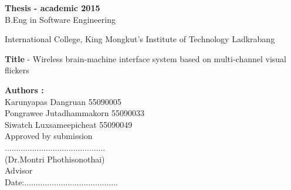 \begin{approve}
\textbf{Thesis - academic 2015}\\
B.Eng in Software Engineering

International College, King Mongkut's Institute of Technology Ladkrabang


\textbf{Title} - Wireless brain-machine interface system based on multi-channel visual flickers

\textbf{Authors :}\\
Karunyapas  Dangruan  55090005\\
Pongrawee  Jutadhammakorn 55090033\\
Siwatch  Luxsameepicheat  55090049\\

\hspace{10cm} Approved by submission\\
\hspace{10cm}............................................\\
\hspace{10cm}(Dr.Montri Phothisonothai)\\
Advisor\\

Date:.........................................\\



\end{approve}